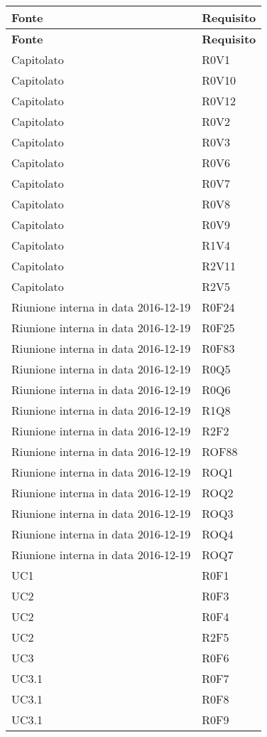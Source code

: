 \documentclass[../AnalisiDeiRequisiti.tex]{subfiles}
\begin{document}
\begin{longtable}{p{4cm}!{\VRule[1pt]}p{4cm}}
\color{white} \textbf{Fonte} & \color{white} \textbf{Requisito} \\ 
\endfirsthead 
{} 
\color{white} \textbf{Fonte} & \color{white} \textbf{Requisito} \\ 
\endhead 
Capitolato & R0V1 \\
Capitolato & R0V10 \\
Capitolato & R0V12 \\
Capitolato & R0V2 \\
Capitolato & R0V3 \\
Capitolato & R0V6 \\
Capitolato & R0V7 \\
Capitolato & R0V8 \\
Capitolato & R0V9 \\
Capitolato & R1V4 \\
Capitolato & R2V11 \\
Capitolato & R2V5 \\
Riunione interna in data 2016-12-19 & R0F24 \\
Riunione interna in data 2016-12-19 & R0F25 \\
Riunione interna in data 2016-12-19 & R0F83 \\
Riunione interna in data 2016-12-19 & R0Q5 \\
Riunione interna in data 2016-12-19 & R0Q6 \\
Riunione interna in data 2016-12-19 & R1Q8 \\
Riunione interna in data 2016-12-19 & R2F2 \\
Riunione interna in data 2016-12-19 & ROF88 \\
Riunione interna in data 2016-12-19 & ROQ1 \\
Riunione interna in data 2016-12-19 & ROQ2 \\
Riunione interna in data 2016-12-19 & ROQ3 \\
Riunione interna in data 2016-12-19 & ROQ4 \\
Riunione interna in data 2016-12-19 & ROQ7 \\
UC1 & R0F1 \\
UC2 & R0F3 \\
UC2 & R0F4 \\
UC2 & R2F5 \\
UC3 & R0F6 \\
UC3.1 & R0F7 \\
UC3.1 & R0F8 \\
UC3.1 & R0F9 \\

\end{longtable}
\end{document}
